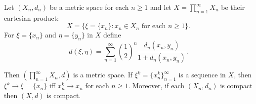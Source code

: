 Let $(X_n, d_n)$ be a metric space for each $n \geq 1$ and let $X = \prod_{n=1}^{\infty} X_n$ be their cartesian product:
$$X = \{\xi = \{x_n\} : x_n \in X_n \text{ for each } n \geq 1\}.$$
For $\xi = \{x_n\}$ and $\eta = \{y_n\}$ in $X$ define
$$d(\xi, \eta) = \sum_{n=1}^{\infty} \left(\frac{1}{2}\right)^n \frac{d_n(x_n, y_n)}{1 + d_n(x_n, y_n)}.$$

Then $(\prod_{n=1}^{\infty} X_n, d)$ is a metric space. If $\xi^k = \{x_n^k\}_{n=1}^{\infty}$ is a sequence in $X$, then $\xi^k \to \xi = \{x_n\}$ iff $x_n^k \to x_n$ for each $n \geq 1$. Moreover, if each $(X_n, d_n)$ is compact then $(X, d)$ is compact.
